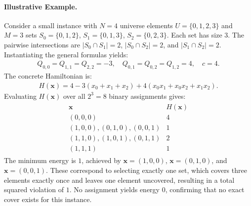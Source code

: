 \documentclass[12pt]{article}
\begin{document}
\paragraph{Illustrative Example.}
Consider a small instance with $N=4$ universe elements $U=\{0,1,2,3\}$ and $M=3$ sets $S_0=\{0,1,2\}$, $S_1=\{0,1,3\}$, $S_2=\{0,2,3\}$. Each set has size $3$. The pairwise intersections are $|S_0 \cap S_1| = 2$, $|S_0 \cap S_2| = 2$, and $|S_1 \cap S_2| = 2$. Instantiating the general formulas yields:
\begin{align}
Q_{0,0} = Q_{1,1} = Q_{2,2} = -3, \quad Q_{0,1} = Q_{0,2} = Q_{1,2} = 4, \quad c = 4.
\end{align}
The concrete Hamiltonian is:
\begin{align}
H(\mathbf{x}) = 4 - 3(x_0 + x_1 + x_2) + 4(x_0 x_1 + x_0 x_2 + x_1 x_2).
\end{align}
Evaluating $H(\mathbf{x})$ over all $2^3 = 8$ binary assignments gives:
\begin{align}
\begin{array}{c|c}
\mathbf{x} & H(\mathbf{x}) \\ \hline
(0,0,0) & 4 \\
(1,0,0), (0,1,0), (0,0,1) & 1 \\
(1,1,0), (1,0,1), (0,1,1) & 2 \\
(1,1,1) & 1
\end{array}
\end{align}
The minimum energy is $1$, achieved by $\mathbf{x}=(1,0,0)$, $\mathbf{x}=(0,1,0)$, and $\mathbf{x}=(0,0,1)$. These correspond to selecting exactly one set, which covers three elements exactly once and leaves one element uncovered, resulting in a total squared violation of $1$. No assignment yields energy $0$, confirming that no exact cover exists for this instance.
\end{document}
